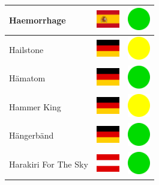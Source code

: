 \documentclass[12pt, a4paper, twoside]{report}
\begin{document}
\begin{center}
\begin{longtable}{|p{5cm}|p{2cm}|p{2cm}|}
 Haemorrhage                                                & \includegraphics[width=1cm]{4x3/es} &   \includegraphics[width=1cm]{likes/y} \\ \hline
 Hailstone                                                  & \includegraphics[width=1cm]{4x3/de} &   \includegraphics[width=1cm]{likes/m} \\ \hline
 Hämatom                                                    & \includegraphics[width=1cm]{4x3/de} &   \includegraphics[width=1cm]{likes/y} \\ \hline
 Hammer King                                                & \includegraphics[width=1cm]{4x3/de} &   \includegraphics[width=1cm]{likes/m} \\ \hline
 Hängerbänd                                                 & \includegraphics[width=1cm]{4x3/de} &   \includegraphics[width=1cm]{likes/y} \\ \hline
 Harakiri For The Sky                                       & \includegraphics[width=1cm]{4x3/at} &   \includegraphics[width=1cm]{likes/y} \\ \hline

\end{longtable}
\end{center}
\end{document}
